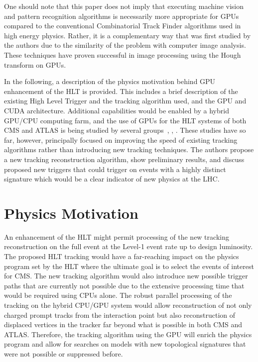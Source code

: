 \documentclass{JINST}
\begin{document}
One should note that this paper does not imply that executing machine vision and pattern recognition 
algorithms is necessarily more appropriate for GPUs compared to the conventional Combinatorial Track 
Finder algorithms used in high energy physics. Rather, it is a complementary way that was first studied
 by the authors due to the similarity of the problem with computer image analysis. These techniques have
 proven successful in image processing using the Hough transform on GPUs.


In the following, a description of the physics motivation behind GPU enhancement of the HLT is provided.  This
includes a brief description of the existing High Level Trigger and the tracking algorithm used, and the GPU
and CUDA architecture.  Additional capabilities would be enabled by a hybrid GPU/CPU computing farm, and the
use of GPUs for the HLT systems of both CMS and ATLAS is being studied by several
groups~\cite{Emeliyanov:2012mg}, \cite{Mattmann:2012hi}, \cite{Clark:2011zzb}. These studies have so far,
however, principally focused on improving the speed of existing tracking algorithms rather than introducing
new tracking techniques.  The authors propose a new tracking reconstruction algorithm, show preliminary
results, and discuss proposed new triggers that could trigger on events with a highly distinct signature which
would be a clear indicator of new physics at the LHC.


\section{Physics Motivation}

An enhancement of the HLT might permit processing of the new tracking reconstruction on the full event 
at the Level-1 event rate up to design luminosity. The proposed HLT tracking would have a far-reaching impact on the physics program 
set by the HLT where the ultimate goal is to select the events of interest for CMS.
The new tracking algorithm would also introduce new possible trigger paths that are currently not possible due to the extensive
 processing time that would be required using CPUs alone. The robust parallel processing of the tracking on the 
hybrid CPU/GPU system would allow reconstruction of not only charged prompt tracks from the interaction point
but also reconstruction of displaced vertices in the tracker far beyond what is possible in both CMS and ATLAS.
Therefore, the tracking algorithm using the GPU will enrich the physics program and allow for searches on models with new topological signatures that were not possible or suppressed before.
\end{document}

